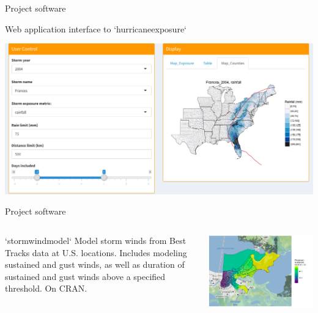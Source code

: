 \documentclass[ignorenonframetext,]{beamer}
\begin{document}
\begin{frame}{Project software}

\vspace{-0.2cm} \large

\begin{center}
Web application interface to `hurricaneexposure`
\end{center}

\vspace{-0.3cm}

\includegraphics[width=\textwidth]{hurricane_exposure_website}

\end{frame}

\begin{frame}{Project software}

\begin{columns}
\begin{column}{0.3\textwidth}
\footnotesize
\begin{block}{`stormwindmodel`}
Model storm winds from Best Tracks data at U.S. locations. Includes modeling sustained and gust winds, as well as duration of sustained and gust winds above a specified threshold. On CRAN.
\end{block}
\end{column}
\begin{column}{0.7\textwidth}

\begin{center}\includegraphics[width=\textwidth]{census_track_modeled_winds} \end{center}
\end{column}
\end{columns}

\end{frame}
\end{document}
